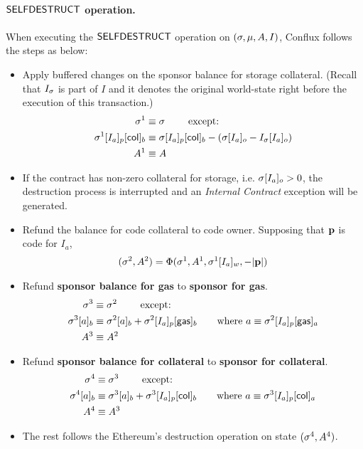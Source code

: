 \paragraph{$\mathsf{SELFDESTRUCT}$ operation.} When executing the $\mathsf{SELFDESTRUCT}$ operation on $(\mathbf{\sigma},\mu,A,I)$, Conflux follows the steps as below:
\begin{itemize}[nosep]
	\item Apply buffered changes on the sponsor balance for storage collateral. 
	(Recall that $I_{\mathbf{\sigma}}$ is part of $I$ and it denotes the original world-state right before the execution of this transaction.)
	\begin{align}
		\mathbf{\sigma}^1  &\equiv \mathbf{\sigma} \qquad \mbox{ except:}\\
		\mathbf{\sigma}^1[I_a]_p[{\sf col}]_b &\equiv \mathbf{\sigma}[I_a]_p[{\sf col}]_b - \left(\mathbf{\sigma}[I_a]_o-I_{\mathbf{\sigma}}[I_a]_o\right) \\
		A^1 &\equiv A
	\end{align}

	\item If the contract has non-zero collateral for storage, i.e. $\mathbf{\sigma}[I_a]_o>0$, 
	the destruction process is interrupted and an \emph{Internal Contract} exception will be generated.


	\item Refund the balance for code collateral to code owner. 
	Supposing that ${\bf p}$ is code for $I_a$, 
	\begin{align}
		(\mathbf{\sigma}^2,A^2) = \Phi(\mathbf{\sigma}^1,A^1,\mathbf{\sigma}^1[I_a]_w,-|{\bf p}|)
	\end{align}

	\item Refund {\bf sponsor balance for gas} to {\bf sponsor for gas}.
	\begin{align}
		\mathbf{\sigma}^3  &\equiv \mathbf{\sigma}^2 \qquad \mbox{  except:}\\
		\mathbf{\sigma}^3[a]_b&\equiv\mathbf{\sigma}^2[a]_b+\mathbf{\sigma}^2[I_a]_p[{\sf gas}]_b
		\qquad\text{where $a  \equiv \mathbf{\sigma}^2[I_a]_p[{\sf gas}]_a$} \\
		A^3 &\equiv A^2
	\end{align}

	\item Refund {\bf sponsor balance for collateral} to {\bf sponsor for collateral}.
	\begin{align}
		\mathbf{\sigma}^4  &\equiv \mathbf{\sigma}^3 \qquad \mbox{  except:}\\
		\mathbf{\sigma}^4[a]_b&\equiv\mathbf{\sigma}^3[a]_b+\mathbf{\sigma}^3[I_a]_p[{\sf col}]_b
		\qquad\text{where $a \equiv \mathbf{\sigma}^3[I_a]_p[{\sf col}]_a$} \\
		A^4 &\equiv A^3
	\end{align}

	\item The rest follows the Ethereum's destruction operation on state $(\mathbf{\sigma}^4,A^4)$.
\end{itemize}

